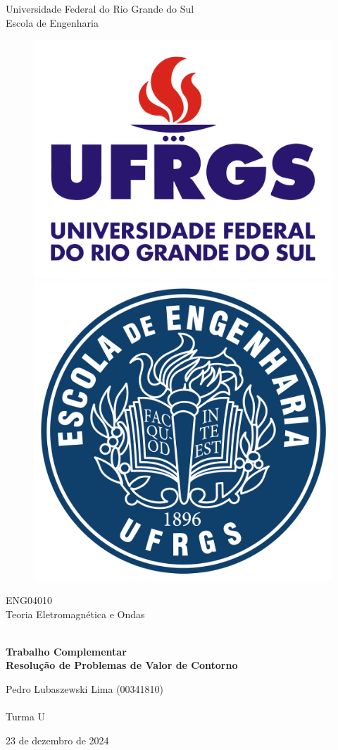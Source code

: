 \documentclass{report}
\begin{document}
    \begin{titlepage}
        \centering
        
        \LARGE {Universidade Federal do Rio Grande do Sul \\ Escola de Engenharia}
    
        \begin{figure}[h!]
        \centering
        \subfigure
        {\includegraphics[width=0.35\linewidth]{images/logos/UFRGS.png}}
        \hspace{1cm}
        \subfigure
        {\includegraphics[width=0.3\linewidth]{images/logos/EE.png}}
        \end{figure}
    
        \LARGE {ENG04010 \\ Teoria Eletromagnética e Ondas}
        
        \vfill
        {\noindent\hrulefill \\
        \bfseries \Huge{Trabalho Complementar} \\ \LARGE{Resolução de Problemas de Valor de Contorno} \\
        \noindent\hrulefill}
        
        \vfill
        {\LARGE Pedro Lubaszewski Lima (00341810) \\~\\ Turma U}
    
        \vfill
        {\LARGE 23 de dezembro de 2024}
        
    \end{titlepage}

        \renewcommand{\contentsname}{Sumário}
        \tableofcontents
        \clearpage
\end{document}
